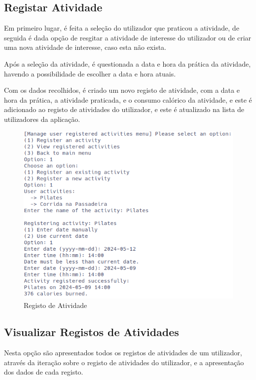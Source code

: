 \documentclass[a4paper,12pt]{scrreprt}
\begin{document}
    \clearpage
    \subsection{Registar Atividade}
    Em primeiro lugar, é feita a seleção do utilizador que praticou a atividade,
    de seguida é dada opção de resgitar a atividade de interesse do utilizador ou
    de criar uma nova atividade de interesse, caso esta não exista.

    Após a seleção da atividade, é questionada a data e hora da prática da atividade,
    havendo a possibilidade de escolher a data e hora atuais.

    Com os dados recolhidos, é criado um novo registo de atividade, com a data e hora da prática,
    a atividade praticada, e o consumo calórico da atividade, e este é adicionado ao registo de atividades do utilizador,
    e este é atualizado na lista de utilizadores da aplicação.

    \begin{figure}[!ht]
        \centering
        \includegraphics[width=\textwidth]{images/registerActivity.png}
        \caption{Registo de Atividade}
        \label{fig:register-activity}
    \end{figure}

    \clearpage
    \subsection{Visualizar Registos de Atividades}
    Nesta opção são apresentados todos os registos de atividades de um utilizador,
    através da iteração sobre o registo de atividades do utilizador,
    e a apresentação dos dados de cada registo.
\end{document}
